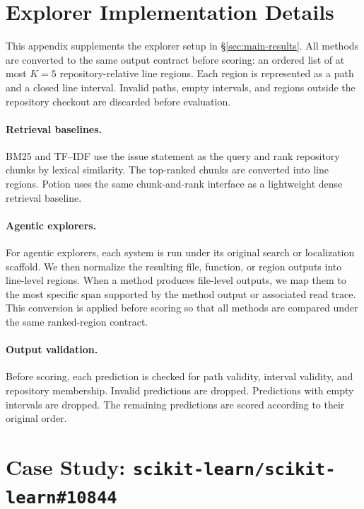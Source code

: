 \section{Explorer Implementation Details}
\label{app:explorers}

This appendix supplements the explorer setup in \S\ref{sec:main-results}. All
methods are converted to the same output contract before scoring: an ordered
list of at most $K=5$ repository-relative line regions. Each region is represented
as a path and a closed line interval. Invalid paths, empty intervals, and regions
outside the repository checkout are discarded before evaluation.

\paragraph{Retrieval baselines.}
BM25 and TF--IDF use the issue statement as the query and rank repository chunks
by lexical similarity. The top-ranked chunks are converted into line regions.
Potion uses the same chunk-and-rank interface as a lightweight dense retrieval
baseline.

\paragraph{Agentic explorers.}
For agentic explorers, each system is run under its original search or
localization scaffold. We then normalize the resulting file, function, or region
outputs into line-level regions. When a method produces file-level outputs, we
map them to the most specific span supported by the method output or associated
read trace. This conversion is applied before scoring so that all methods are
compared under the same ranked-region contract.

\paragraph{Output validation.}
Before scoring, each prediction is checked for path validity, interval validity,
and repository membership. Invalid predictions are dropped. Predictions with
empty intervals are dropped. The remaining predictions are scored according to
their original order.


\section{Case Study: \texttt{scikit-learn/scikit-learn\#10844}}
\label{appendix:case-study}

